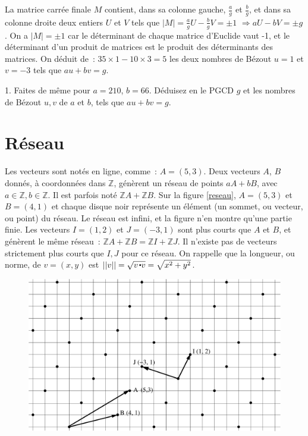 \documentclass[11pt]{article}
\def\Z{\mathbb Z}
\begin{document}
{La matrice carrée finale $M$  contient, dans sa colonne gauche, $\frac{a}{g}$ et $\frac{b}{g}$,
et dans sa colonne droite deux entiers $U$ et $V$ tels que
$|M|=\frac{a}{g} U - \frac{b}{g} V = \pm 1$ $\Rightarrow aU - b V= \pm g$. On a $|M|=\pm 1$
car  le déterminant de chaque matrice d'Euclide vaut -1, 
et le déterminant d'un produit de matrices 
est le produit des déterminants des matrices. On  déduit de~: 
$ 35 \times 1 - 10 \times 3 = 5$ 
les  deux nombres de Bézout $u=1$ et $v= -3$  tels que
$au + bv =g$.

1. Faites de même  pour $a=210$, $b=66$.
Déduisez en le PGCD $g$ et les nombres de Bézout $u, v$ de $a$ et $b$, tels que
$au+bv=g$.
}







{
\section{Réseau}
Les vecteurs sont notés en ligne, comme~: $A=(5, 3)$.
Deux vecteurs $A$, $B$ donnés, à coordonnées dans $\Z$,
génèrent un réseau de points $aA + bB$, avec $a\in \Z, b\in\Z$. 
Il est parfois noté $\Z A + \Z B$.
Sur la figure \ref{reseau}, $A=(5, 3)$ et $B=(4, 1)$ et chaque disque noir  représente
un élément (un sommet, ou vecteur, ou point) du réseau. Le réseau est infini, et la figure n'en montre qu'une partie finie.
Les
vecteurs  $I=(1, 2)$ et $J=(-3, 1)$ sont plus courts que $A$ et $B$, et génèrent le même réseau~: $\Z A + \Z B = \Z I + \Z J$. 
Il n'existe pas de vecteurs strictement plus courts que $I, J$ pour ce réseau. 
On rappelle que la longueur, ou norme, de $v=(x, y)$ est $||v||=\sqrt{v \smallbullet v}=\sqrt{x^2+y^2}$.

{
\begin{figure}
\begin{center}
\includegraphics[width=0.99\linewidth]{dessin3.eps}
\end{center}


\end{figure}}}
\end{document}
